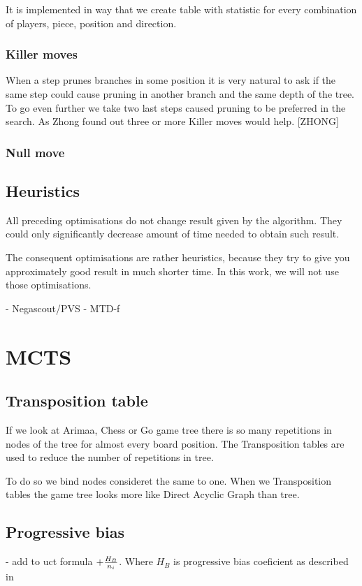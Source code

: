 	It is implemented in way that we create table with statistic for every
	combination of players, piece, position and direction.

	\subsubsection{Killer moves}
	When a step prunes branches in some position it is very natural to ask if
	the same step could cause pruning in another branch and the same depth of
	the tree. To go even further we take two last steps caused pruning to be
	preferred in the search. As Zhong found out three or more Killer moves would help. [ZHONG]

	\subsubsection{Null move}

\subsection{Heuristics}
All preceding optimisations do not change result given by the algorithm. They
could only significantly decrease amount of time needed to obtain such result.

The consequent optimisations are rather heuristics, because they try to
give you approximately good result in much shorter time. In this work, we
will not use those optimisations.


- Negascout/PVS
- MTD-f


\section{MCTS}
\subsection{Transposition table}
If we look at Arimaa, Chess or Go game tree there is so many repetitions in
nodes of the tree for almost every board position. The Transposition tables
are used to reduce the number of repetitions in tree.

To do so we bind nodes consideret the same to one. When we Transposition
tables the game tree looks more like Direct Acyclic Graph than tree.

\subsection{Progressive bias}
- add to uct formula $+ {H_B \over n_i}$. Where $H_B$ is progressive bias
coeficient as described in 
